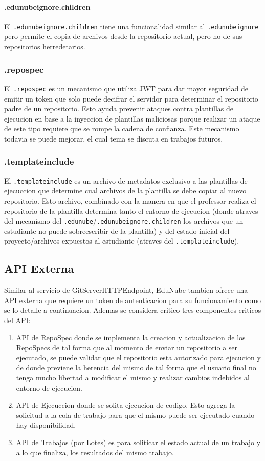\paragraph{.edunubeignore.children}
El \texttt{.edunubeignore.children} tiene una funcionalidad similar al \texttt{.edunubeignore} pero permite el copia de archivos desde la repositorio actual, pero no de sus repositorios herredetarios.
\subsubsection{.repospec}
El \texttt{.repospec} es un mecanismo que utiliza JWT para dar mayor seguridad de emitir un token que solo puede decifrar el servidor para determinar el repositorio padre de un repositorio. Esto ayuda prevenir ataques contra plantillas de ejecucion en base a la inyeccion de plantillas maliciosas porque realizar un ataque de este tipo requiere que se rompe la cadena de confianza. Este mecanismo todavia se puede mejorar, el cual tema se discuta en trabajos futuros.
\subsubsection{.templateinclude}
El \texttt{.templateinclude} es un archivo de metadatos exclusivo a las plantillas de ejecuccion que determine cual archivos de la plantilla se debe copiar al nuevo repositorio. Esto archivo, combinado con la manera en que el professor realiza el repositorio de la plantilla determina tanto el entorno de ejecucion (donde atraves del mecanismo del \texttt{.edunube}/\texttt{.edunubeignore.children} los archivos que un estudiante no puede sobreescribir de la plantilla) y del estado inicial del proyecto/archivos expuestos al estudiante (atraves del \texttt{.templateinclude}).

\subsection{API Externa}
Similar al servicio de GitServerHTTPEndpoint, EduNube tambien ofrece una API externa que requiere un token de autenticacion para su funcionamiento como se lo detalle a continuacion. Ademas se considera critico tres componentes criticos del API:
\begin{enumerate}
  \item API de RepoSpec donde se implementa la creacion y actualizacion de los RepoSpecs de tal forma que al momento de enviar un repositorio a ser ejecutado, se puede validar que el repositorio esta autorizado para ejecucion y de donde previene la herencia del mismo de tal forma que el usuario final no tenga mucho libertad a modificar el mismo y realizar cambios indebidos al entorno de ejecucion.
  \item API de Ejecuccion donde se solita ejecucion de codigo. Esto agrega la solicitud a la cola de trabajo para que el mismo puede ser ejecutado cuando hay disponibilidad.
  \item API de Trabajos (por Lotes) es para soliticar el estado actual de un trabajo y a lo que finaliza, los resultados del mismo trabajo.
\end{enumerate}

